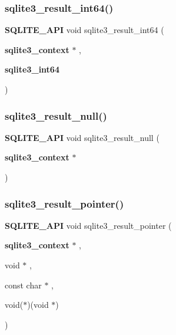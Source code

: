 \subsubsection{sqlite3\_result\_int64()}
{\footnotesize\ttfamily \textbf{ S\+Q\+L\+I\+T\+E\+\_\+\+A\+PI} void sqlite3\+\_\+result\+\_\+int64 (\begin{DoxyParamCaption}\item[{\textbf{ sqlite3\+\_\+context} $\ast$}]{,  }\item[{\textbf{ sqlite3\+\_\+int64}}]{ }\end{DoxyParamCaption})}

\mbox{\label{sqlite3_8h_ae12fb68e78a29fc818347422d1285aaf}} 
\subsubsection{sqlite3\_result\_null()}
{\footnotesize\ttfamily \textbf{ S\+Q\+L\+I\+T\+E\+\_\+\+A\+PI} void sqlite3\+\_\+result\+\_\+null (\begin{DoxyParamCaption}\item[{\textbf{ sqlite3\+\_\+context} $\ast$}]{ }\end{DoxyParamCaption})}

\mbox{\label{sqlite3_8h_ab59212b6f330a64fab6fe17794a40d1b}} 
\subsubsection{sqlite3\_result\_pointer()}
{\footnotesize\ttfamily \textbf{ S\+Q\+L\+I\+T\+E\+\_\+\+A\+PI} void sqlite3\+\_\+result\+\_\+pointer (\begin{DoxyParamCaption}\item[{\textbf{ sqlite3\+\_\+context} $\ast$}]{,  }\item[{void $\ast$}]{,  }\item[{const char $\ast$}]{,  }\item[{void($\ast$)(void $\ast$)}]{ }\end{DoxyParamCaption})}

\mbox{\label{sqlite3_8h_a648c42e4a80ef942deb984c157f631bd}} 
